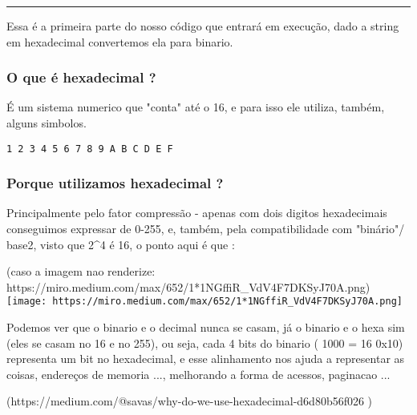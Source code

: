 \documentclass[11pt]{article}
\makeatletter
\def\maxwidth{\ifdim\Gin@nat@width>\linewidth\linewidth
    \else\Gin@nat@width\fi}
\let\Oldincludegraphics\includegraphics
\renewcommand{\includegraphics}[1]{\Oldincludegraphics[width=.8\maxwidth]{#1}}
\makeatother
\begin{document}
\begin{center}\rule{0.5\linewidth}{\linethickness}\end{center}

    Essa é a primeira parte do nosso código que entrará em execução, dado a
string em hexadecimal convertemos ela para binario.

\subsubsection{O que é hexadecimal ?}\label{o-que-uxe9-hexadecimal}

É um sistema numerico que "conta" até o 16, e para isso ele utiliza,
também, alguns simbolos.

\begin{verbatim}
1 2 3 4 5 6 7 8 9 A B C D E F
\end{verbatim}

\subsubsection{Porque utilizamos hexadecimal
?}\label{porque-utilizamos-hexadecimal}

Principalmente pelo fator compressão - apenas com dois digitos
hexadecimais conseguimos expressar de 0-255, e, também, pela
compatibilidade com "binário"/ base2, visto que 2\^{}4 é 16, o ponto
aqui é que :

(caso a imagem nao renderize:
https://miro.medium.com/max/652/1*1NGffiR\_VdV4F7DKSyJ70A.png)
\texttt{[image: https://miro.medium.com/max/652/1*1NGffiR\_VdV4F7DKSyJ70A.png]}

Podemos ver que o binario e o decimal nunca se casam, já o binario e o
hexa sim (eles se casam no 16 e no 255), ou seja, cada 4 bits do binario
( 1000 = 16 0x10) representa um bit no hexadecimal, e esse alinhamento
nos ajuda a representar as coisas, endereços de memoria ..., melhorando
a forma de acessos, paginacao ...

(https://medium.com/@savas/why-do-we-use-hexadecimal-d6d80b56f026 )
\end{document}
